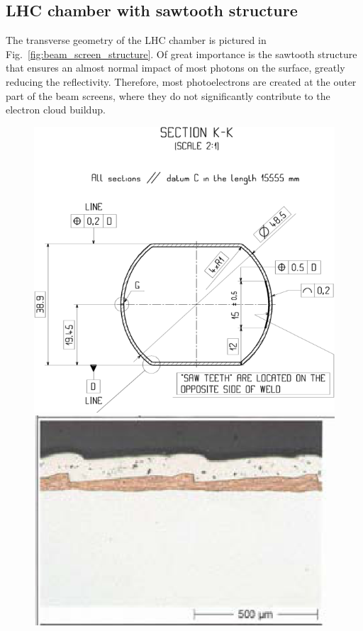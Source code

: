 
\subsection{LHC chamber with sawtooth structure}
The transverse geometry of the LHC chamber is pictured in Fig.~\ref{fig:beam_screen_structure}.
Of great importance is the sawtooth structure that ensures an almost normal impact of most photons on the surface, greatly reducing the reflectivity.
Therefore, most photoelectrons are created at the outer part of the beam screens, where they do not significantly contribute to the electron cloud buildup.


\begin{figure}[tbh]
    \centering
    \begin{minipage}[c]{0.47\textwidth}
        \includegraphics[width=\textwidth]{../ss/beam_screen_drawing.png}
    \end{minipage}
    \hspace{0.5cm}
    \begin{minipage}[c]{0.47\textwidth}
        \includegraphics[width=\textwidth]{../ss/sawtooth_fine.png}

\end{minipage}
\end{figure}
